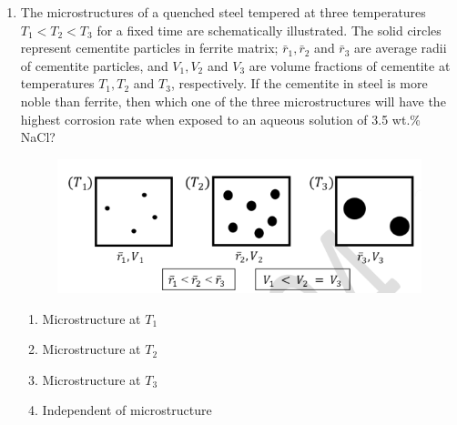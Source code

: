 \documentclass[journal]{IEEEtran}
\theoremstyle{remark}
\begin{document}
\begin{enumerate}[resume]
\item The microstructures of a quenched steel tempered at three temperatures $T_1 < T_2 < T_3$ for a fixed time are schematically illustrated. The solid circles represent cementite particles in ferrite matrix; $\bar{r}_1, \bar{r}_2$ and $\bar{r}_3$ are average radii of cementite particles, and $V_1, V_2$ and $V_3$ are volume fractions of cementite at temperatures $T_1, T_2$ and $T_3$, respectively. If the cementite in steel is more noble than ferrite, then which one of the three microstructures will have the highest corrosion rate when exposed to an aqueous solution of 3.5 wt.\% NaCl? \hfill{}
\begin{figure}[H]
    \centering
    \includegraphics[width=0.6\columnwidth]{figs/Q.42.png}
    \caption{}
    \label{fig:placeholder}
\end{figure}
\begin{enumerate}
\item Microstructure at $T_1$
\item Microstructure at $T_2$
\item Microstructure at $T_3$
\item Independent of microstructure
\end{enumerate}


\end{enumerate}
\end{document}
